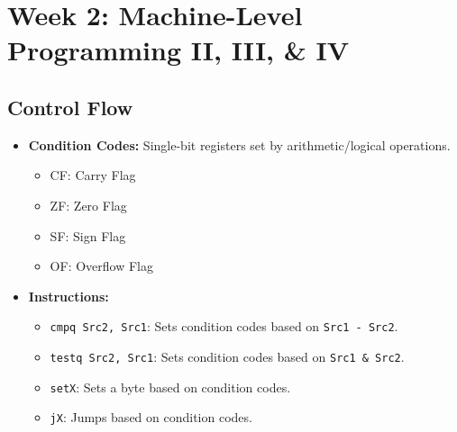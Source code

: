 \documentclass[10pt]{article}
\begin{document}
\section{Week 2: Machine-Level Programming II, III, \& IV}

\subsection{Control Flow}
\begin{itemize}
    \item \textbf{Condition Codes:} Single-bit registers set by arithmetic/logical operations.
    \begin{itemize}
        \item CF: Carry Flag
        \item ZF: Zero Flag
        \item SF: Sign Flag
        \item OF: Overflow Flag
    \end{itemize}
    \item \textbf{Instructions:}
    \begin{itemize}
        \item \texttt{cmpq Src2, Src1}: Sets condition codes based on \texttt{Src1 - Src2}.
        \item \texttt{testq Src2, Src1}: Sets condition codes based on \texttt{Src1 \& Src2}.
        \item \texttt{setX}: Sets a byte based on condition codes.
        \item \texttt{jX}: Jumps based on condition codes.
    \end{itemize}
\end{itemize}
\end{document}
